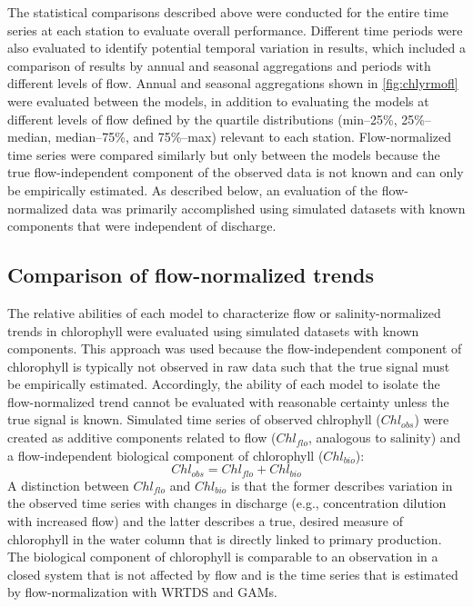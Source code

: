 \documentclass[letterpaper,12pt,oneside]{article}\usepackage[]{graphicx}\usepackage[]{color}
\begin{document}
The statistical comparisons described above were conducted for the entire time series at each station to evaluate overall performance.  Different time periods were also evaluated to identify potential temporal variation in results, which included a comparison of results by annual and seasonal aggregations and periods with different levels of flow.  Annual and seasonal aggregations shown in \cref{fig:chlyrmofl} were evaluated between the models, in addition to evaluating the models at different levels of flow defined by the quartile distributions (min--25\%, 25\%--median, median--75\%, and 75\%--max) relevant to each station.  Flow-normalized time series were compared similarly but only between the models because the true flow-independent component of the observed data is not known and can only be empirically estimated.  As described below, an evaluation of the flow-normalized data was primarily accomplished using simulated datasets with known components that were independent of discharge.  


\subsection{Comparison of flow-normalized trends}

The relative abilities of each model to characterize flow or salinity-normalized trends in chlorophyll were evaluated using simulated datasets with known components.  This approach was used because the flow-independent component of chlorophyll is typically not observed in raw data such that the true signal must be empirically estimated.  Accordingly, the ability of each model to isolate the flow-normalized trend cannot be evaluated with reasonable certainty unless the true signal is known.  Simulated time series of observed chlrophyll ($Chl_{obs}$) were created as additive components related to flow ($Chl_{flo}$, analogous to salinity) and a flow-independent biological component of chlorophyll ($Chl_{bio}$):
\begin{equation} \label{chlobs}
Chl_{obs} = Chl_{flo} + Chl_{bio}
\end{equation}
A distinction between $Chl_{flo}$ and $Chl_{bio}$ is that the former describes variation in the observed time series with changes in discharge (e.g., concentration dilution with increased flow) and the latter describes a true, desired measure of chlorophyll in the water column that is directly linked to primary production.  The biological component of chlorophyll is comparable to an observation in a closed system that is not affected by flow and is the time series that is estimated by flow-normalization with \ac{WRTDS} and \acp{GAM}.
\end{document}
